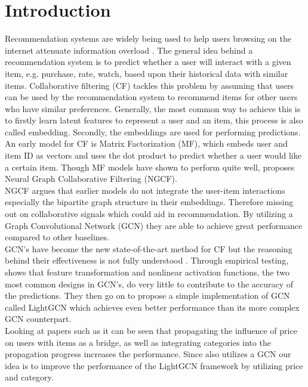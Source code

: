\section{Introduction}
Recommendation systems are widely being used to help users browsing on the internet attenuate information overload \cite{YT_rec,Pint_rec}.
The general idea behind a recommendation system is to predict whether a user will interact with a given item, e.g. purchase, rate, watch, based upon their historical data with similar items.
Collaborative filtering (CF) tackles this problem by assuming that users can be used by the recommendation system to recommend items for other users who have similar preferences.
Generally, the most common way to achieve this is to firstly learn latent features to represent a user and an item, this process is also called embedding.
Secondly, the embeddings are used for performing predictions.
\\
An early model for CF is Matrix Factorization (MF), which embeds user and item ID as vectors and uses the dot product to predict whether a user would like a certain item.
Though MF models have shown to perform quite well, \cite{NGCF_2019} proposes Neural Graph Collaborative Filtering (NGCF).
\\
NGCF argues that earlier models do not integrate the user-item interactions especially the bipartite graph structure in their embeddings.
Therefore missing out on collaborative signals which could aid in recommendation.
By utilizing a Graph Convolutional Network (GCN) they are able to achieve great performance compared to other baselines.
\\
GCN's have become the new state-of-the-art method for CF but the reasoning behind their effectiveness is not fully understood \cite{lightgcn}.
Through empirical testing, \cite{lightgcn} shows that feature transformation and nonlinear activation functions, the two most common designs in GCN's, do very little to contribute to the accuracy of the predictions.
They then go on to propose a simple implementation of GCN called LightGCN which achieves even better performance than its more complex GCN counterpart.
\\
Looking at papers such as \cite{Priceaware} it can be seen that propagating the influence of price on users with items as a bridge, as well as integrating categories into the propagation progress increases the performance.
Since \cite{Priceaware} also utilizes a GCN our idea is to improve the performance of the LightGCN framework by utilizing price and category.

